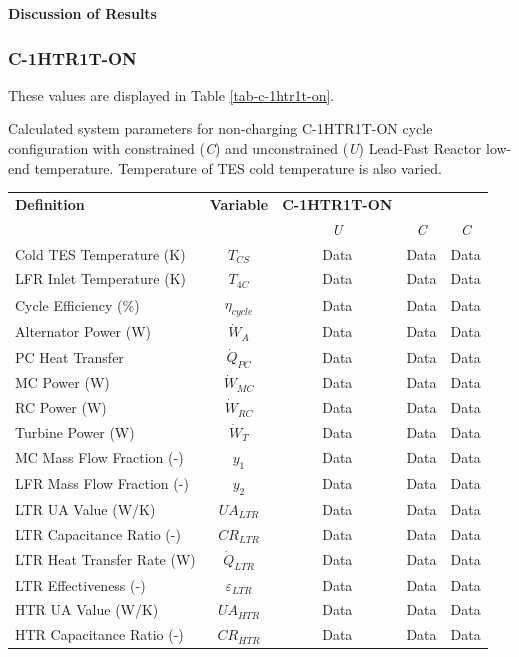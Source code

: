 \begin{paracol}{2}
\textbf{Discussion of Results}

\subsubsection{C-1HTR1T-ON}

These values are displayed in Table \ref{tab-c-1htr1t-on}.

\begin{specialtable}[H] 
    \caption{Calculated system parameters for non-charging C-1HTR1T-ON cycle configuration with constrained (\textit{C}) and unconstrained (\textit{U}) Lead-Fast Reactor low-end temperature. Temperature of TES cold temperature is also varied.\label{tab-c-1htr1t-on}}
    \begin{tabular}{lcccc}
    \toprule
    \textbf{Definition} & \textbf{Variable} & \textbf{C-1HTR1T-ON}\\
    & & \textit{U} & \textit{C} & \textit{C}\\
    \midrule
    Cold TES Temperature (K)	&	$T_{CS}$	&	Data	&	Data	&	Data	\\
    LFR Inlet Temperature (K)	&	$T_{4C}$	&	Data	&	Data	&	Data	\\
    Cycle Efficiency (\%)	&	$\eta_{cycle}$	&	Data	&	Data	&	Data	\\
    Alternator Power (W)	&	$\dot{W}_{A}$	&	Data	&	Data	&	Data	\\
    PC Heat Transfer	&	$\dot{Q}_{PC}$	&	Data	&	Data	&	Data	\\
    MC Power (W)	&	$\dot{W}_{MC}$	&	Data	&	Data	&	Data	\\
    RC Power (W)	&	$\dot{W}_{RC}$	&	Data	&	Data	&	Data	\\
    Turbine Power (W)	&	$\dot{W}_{T}$	&	Data	&	Data	&	Data	\\
    MC Mass Flow Fraction (-)	&	$y_{1}$	&	Data	&	Data	&	Data	\\
    LFR Mass Flow Fraction (-)	&	$y_{2}$	&	Data	&	Data	&	Data	\\
    LTR UA Value (W/K)	&	$UA_{LTR}$	&	Data	&	Data	&	Data	\\
    LTR Capacitance Ratio (-)	&	$CR_{LTR}$	&	Data	&	Data	&	Data	\\
    LTR Heat Transfer Rate (W)	&	$\dot{Q}_{LTR}$	&	Data	&	Data	&	Data	\\
    LTR Effectiveness (-)	&	$\varepsilon_{LTR}$	&	Data	&	Data	&	Data	\\
    HTR UA Value (W/K)	&	$UA_{HTR}$	&	Data	&	Data	&	Data	\\
    HTR Capacitance Ratio (-)	&	$CR_{HTR}$	&	Data	&	Data	&	Data	\\

\end{tabular}
\end{specialtable}
\end{paracol}
